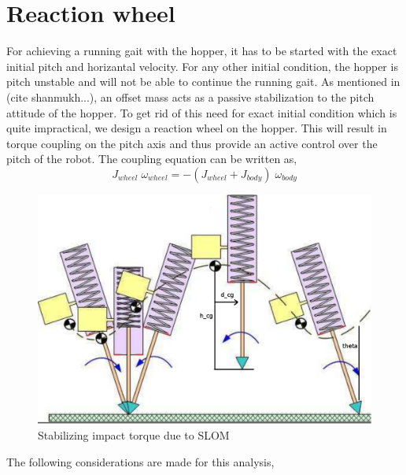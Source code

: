 \section{Reaction wheel}
For achieving a running gait with the hopper, it has to be started with the exact initial pitch and horizantal velocity.
For any other initial condition, the hopper is pitch unstable and will not be able to continue the running gait.
As mentioned in (cite shanmukh...), an offset mass acts as a passive stabilization to the pitch attitude of the hopper.
To get rid of this need for exact initial condition which is quite impractical, we design a reaction wheel on the hopper.
This will result in torque coupling on the pitch axis and thus provide an active control over the pitch of the robot.
The coupling equation can be written as,
\begin{equation}
J_{wheel}\;\omega_{wheel} = -(J_{wheel} + J_{body})\;\omega_{body}
\end{equation}
\begin{figure}[!h]
\centering
\includegraphics[scale=1.2]{fig/slom_motion.pdf}
\caption{Stabilizing impact torque due to SLOM}
\label{fig:4_rewac}
\end{figure}
The following considerations are made for this analysis,
